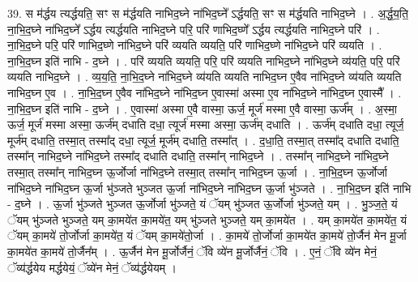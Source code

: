 \documentclass[17pt]{extarticle}
\begin{document}
39. स म॑र्द्धय त्यर्द्धयति॒ सꣳ स म॑र्द्धयति नाभिद॒घ्ने ना॑भिद॒घ्ने᳚ ऽर्द्धयति॒ सꣳ स म॑र्द्धयति नाभिद॒घ्ने । . अ॒र्द्ध॒य॒ति॒ ना॒भि॒द॒घ्ने ना॑भिद॒घ्ने᳚ ऽर्द्धय त्यर्द्धयति नाभिद॒घ्ने परि॒ परि॑ णाभिद॒घ्णे᳚ ऽर्द्धय त्यर्द्धयति नाभिद॒घ्ने परि॑ । . ना॒भि॒द॒घ्ने परि॒ परि॑ णाभिद॒घ्णे ना॑भिद॒घ्ने परि॑ व्ययति व्ययति॒ परि॑ णाभिद॒घ्णे ना॑भिद॒घ्ने परि॑ व्ययति । . ना॒भि॒द॒घ्न इति॑ नाभि - द॒घ्ने । . परि॑ व्ययति व्ययति॒ परि॒ परि॑ व्ययति नाभिद॒घ्ने ना॑भिद॒घ्ने व्य॑यति॒ परि॒ परि॑ व्ययति नाभिद॒घ्ने । . व्य॒य॒ति॒ ना॒भि॒द॒घ्ने ना॑भिद॒घ्ने व्य॑यति व्ययति नाभिद॒घ्न ए॒वैव ना॑भिद॒घ्ने व्य॑यति व्ययति नाभिद॒घ्न ए॒व । . ना॒भि॒द॒घ्न ए॒वैव ना॑भिद॒घ्ने ना॑भिद॒घ्न ए॒वास्मा॑ अस्मा ए॒व ना॑भिद॒घ्ने ना॑भिद॒घ्न ए॒वास्मै᳚ । . ना॒भि॒द॒घ्न इति॑ नाभि - द॒घ्ने । . ए॒वास्मा॑ अस्मा ए॒वै वास्मा॒ ऊर्ज॒ मूर्ज॑ मस्मा ए॒वै वास्मा॒ ऊर्ज᳚म् । . अ॒स्मा॒ ऊर्ज॒ मूर्ज॑ मस्मा अस्मा॒ ऊर्ज॑म् दधाति दधा॒ त्यूर्ज॑ मस्मा अस्मा॒ ऊर्ज॑म् दधाति । . ऊर्ज॑म् दधाति दधा॒ त्यूर्ज॒ मूर्ज॑म् दधाति॒ तस्मा॒त् तस्मा᳚द् दधा॒ त्यूर्ज॒ मूर्ज॑म् दधाति॒ तस्मा᳚त् । . द॒धा॒ति॒ तस्मा॒त् तस्मा᳚द् दधाति दधाति॒ तस्मा᳚न् नाभिद॒घ्ने ना॑भिद॒घ्ने तस्मा᳚द् दधाति दधाति॒ तस्मा᳚न् नाभिद॒घ्ने । . तस्मा᳚न् नाभिद॒घ्ने ना॑भिद॒घ्ने तस्मा॒त् तस्मा᳚न् नाभिद॒घ्न ऊ॒र्जोर्जा ना॑भिद॒घ्ने तस्मा॒त् तस्मा᳚न् नाभिद॒घ्न ऊ॒र्जा । . ना॒भि॒द॒घ्न ऊ॒र्जोर्जा ना॑भिद॒घ्ने ना॑भिद॒घ्न ऊ॒र्जा भु॑ञ्जते भुञ्जत ऊ॒र्जा ना॑भिद॒घ्ने ना॑भिद॒घ्न ऊ॒र्जा भु॑ञ्जते । . ना॒भि॒द॒घ्न इति॑ नाभि - द॒घ्ने । . ऊ॒र्जा भु॑ञ्जते भुञ्जत ऊ॒र्जोर्जा भु॑ञ्जते॒ यं ॅयम् भु॑ञ्जत ऊ॒र्जोर्जा भु॑ञ्जते॒ यम् । . भु॒ञ्ज॒ते॒ यं ॅयम् भु॑ञ्जते भुञ्जते॒ यम् का॒मये॑त का॒मये॑त॒ यम् भु॑ञ्जते भुञ्जते॒ यम् का॒मये॑त । . यम् का॒मये॑त का॒मये॑त॒ यं ॅयम् का॒मये॑ तो॒र्जोर्जा का॒मये॑त॒ यं ॅयम् का॒मये॑तो॒र्जा । . का॒मये॑ तो॒र्जोर्जा का॒मये॑त का॒मये॑ तो॒र्जैन॑ मेन मू॒र्जा का॒मये॑त का॒मये॑ तो॒र्जैन᳚म् । . ऊ॒र्जैन॑ मेन मू॒र्जोर्जैनं॒ ॅवि व्ये॑न मू॒र्जोर्जैनं॒ ॅवि । . ए॒नं॒ ॅवि व्ये॑न मेनं॒ ॅव्य॑र्द्धयेय मर्द्धयेयं॒ ॅव्ये॑न मेनं॒ ॅव्य॑र्द्धयेयम् । \newline
\pagebreak
{}
\end{document}
